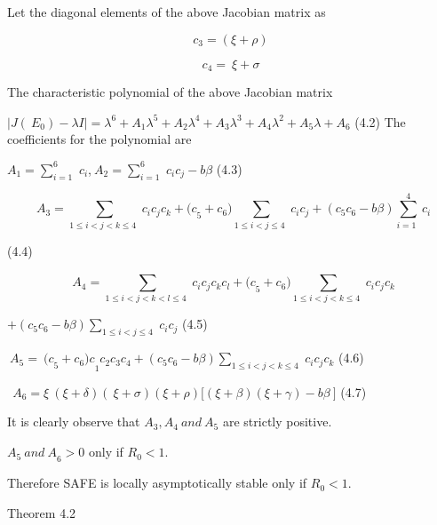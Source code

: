 \documentclass[10pt]{NSP1}
\begin{document}
Let the diagonal elements of the above Jacobian matrix as

\begin{equation}
c_{3} = (\xi + \rho)

\end{equation}

\begin{equation}
c_{4} = \ \xi + \sigma

\end{equation}

The characteristic polynomial of the above Jacobian matrix

$\left| J\left( {\ E}_{0} \right) - \lambda I \right| = \lambda^{6} + A_{1}\lambda^{5} + A_{2}\lambda^{4} + A_{3}\lambda^{3} + A_{4}\lambda^{2} + A_{5}\lambda + A_{6}$ (4.2) The coefficients for the polynomial are

$A_{1} = \sum_{i = 1\ \ }^{6}{}c_{i}$,${\ A}_{2} = \sum_{i = 1\ \ }^{6}{}c_{i}c_{j} - b\beta$ (4.3)

\begin{equation}
{\ \ A}_{3} = \sum_{1 \leq i < j < k \leq 4\ \ }^{}{}c_{i}c_{j}c_{k} + {(c}_{5} + c_{6})\sum_{1 \leq i < j \leq 4\ \ }^{}{}c_{i}c_{j} + (c_{5}c_{6} - b\beta)\sum_{i = 1\ \ }^{4}{}c_{i}

\end{equation}

(4.4)

\begin{equation}
{\ \ A}_{4} = \sum_{1 \leq i < j < k < l \leq 4\ \ }^{}{}c_{i}c_{j}c_{k}c_{l} + {(c}_{5} + c_{6})\sum_{1 \leq i < j < k \leq 4\ \ }^{}{}c_{i}c_{j}c_{k}

\end{equation}

$+ (c_{5}c_{6} - b\beta)\sum_{1 \leq i < j \leq 4\ \ }^{}{}c_{i}c_{j}$ (4.5)

${\ A}_{5} = \ {{(c}_{5} + c_{6})c}_{1}c_{2}c_{3}c_{4} + (c_{5}c_{6} - b\beta)\sum_{1 \leq i < j < k \leq 4\ \ }^{}{}c_{i}c_{j}c_{k}$ (4.6)

${\ \ A}_{6} = \xi\ (\xi + \delta)(\ \xi + \sigma)(\xi + \rho)\lbrack(\xi + \beta)(\xi + \gamma) - b\beta\ \rbrack$ (4.7)

It is clearly observe that $A_{3},A_{4}\ and\ A_{5}$ are strictly positive.

${A_{5}\ and\ A}_{6} > 0$ only if $R_{0} < 1$.

Therefore SAFE is locally asymptotically stable only if $R_{0} < 1.$

Theorem 4.2
\end{document}
